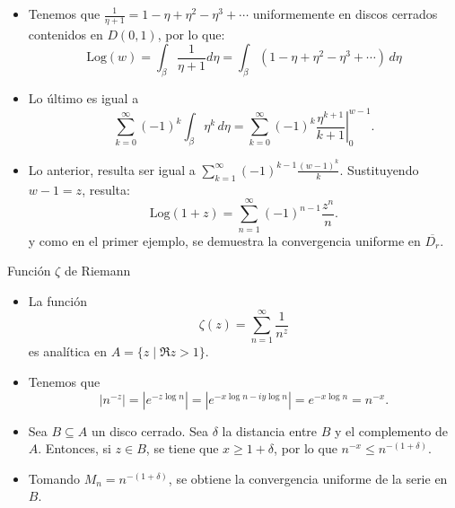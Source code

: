 \documentclass[spanish,presentation]{beamer}
\begin{document}
\begin{frame}[label=sec-1-4]{}
\begin{itemize}
\item Tenemos que \(\frac{1}{\eta+1}=1-\eta+\eta^{2}-\eta^{3}+\cdots\)
uniformemente en discos cerrados contenidos en \(D(0,1)\), por lo
que:
\begin{displaymath}
\mathrm{Log}(w)=\int_{\beta}\frac{1}{\eta+1}d\eta =
\int_{\beta}(1-\eta+\eta^{2}-\eta^{3}+\cdots)\,d\eta
\end{displaymath}
\item Lo último es igual a 
\begin{displaymath}
\sum_{k=0}^{\infty}(-1)^{k}\int_{\beta}\eta^{k}\,d\eta=
\sum_{k=0}^{\infty}(-1)^{k}\left.\frac{\eta^{k+1}}{k+1}\right|_{0}^{w-1}.
\end{displaymath}
\item Lo anterior, resulta ser igual a
\(\sum_{k=1}^{\infty}(-1)^{k-1}\frac{(w-1)^{k}}{k}\). Sustituyendo
\(w-1=z\), resulta:
\begin{displaymath}
\mathrm{Log}(1+z)=\sum_{n=1}^{\infty}(-1)^{n-1}\frac{z^{n}}{n}.
\end{displaymath}
y como en el primer ejemplo, se demuestra la convergencia
uniforme en \(\overline{D_{r}}\).
\end{itemize}
\end{frame}

\begin{frame}[label=sec-1-5]{Función \(\zeta\) de Riemann}
\begin{itemize}
\item La función
\begin{displaymath}
\zeta(z)=\sum_{n=1}^{\infty}\frac{1}{n^{z}}
\end{displaymath}
es analítica en \(A=\{z\mid\Re z>1\}\).
\item Tenemos que 
\begin{displaymath}
|n^{-z}|=|e^{-z\log n}|=|e^{-x\log n-iy\log n}|=e^{-x\log n}=n^{-x}.
\end{displaymath}
\item Sea \(B\subseteq A\) un disco cerrado. Sea \(\delta\) la
distancia entre \(B\) y el complemento de \(A\). Entonces, si
\(z\in B\), se tiene que \(x\geq 1+\delta\), por lo que
\(n^{-x}\leq n^{-(1+\delta)}\).
\item Tomando \(M_{n}=n^{-(1+\delta)}\), se obtiene la convergencia
uniforme de la serie en \(B\).
\end{itemize}
\end{frame}
\end{document}
